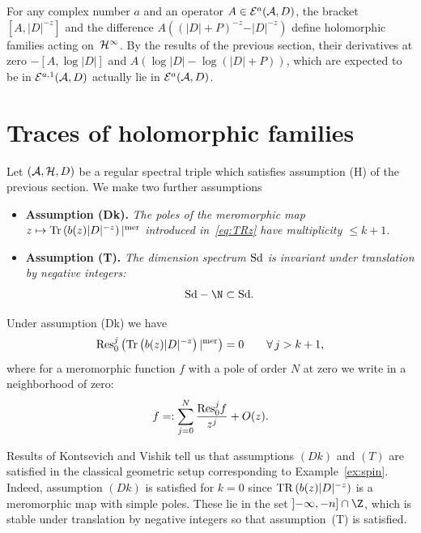 {\sloppy
\begin{example}\label{ex:differencelog}  For any complex number $a$ and an  operator $A\in {\cal E}^a({\cal A}, D)$,  the bracket $[A, \vert D\vert^{-z}]$ and
 the dif\/ference
 $A  \left((\vert D\vert +P)^{-z}-\vert D\vert^{-z }\right)$
  def\/ine holomorphic families acting on~${\cal H}^\infty$.
  By the results of the previous section, their derivatives at zero
   $-[A,\log \vert D\vert]$ and
   $A  \left(\log \vert D\vert -\log \left(\vert D\vert +P\right)\right)$, which are
    expected to be in $ {\cal E}^{a,1}({\cal A}, D)$ actually lie in
    $ {\cal E}^{a}({\cal A}, D)$.
\end{example}

}

\section{Traces of holomorphic families}\label{section5}

Let $\left({\cal A}, {\cal H}, D\right)$ be a regular spectral triple which
satisf\/ies assumption (H)  of the previous section. We  make two  further
assumptions\begin{itemize}
\item\itemsep=0pt
{\bf Assumption (Dk).} {\it  The poles of the meromorphic map $z\mapsto  {\rm Tr}\left(b(z) \vert
    D\vert^{-z}\right)\vert^{\rm mer} $ introduced in~\eqref{eq:TRz}
have  multiplicity $\leq  k+1$.}
\item {\bf Assumption (T).} {\it  The dimension spectrum ${\rm Sd}$ is
    invariant under translation by negative integers:}
    \[
    {\rm Sd}-\N \subset {\rm Sd}.
\]
\end{itemize}

\begin{remark} Under assumption (Dk) we have
\[
{\rm Res}^j_0 \left(  {\rm Tr}\left(b(z) \vert
    D\vert^{-z}\right)\vert^{\rm mer}\right)= 0\qquad \forall\, j> k+1,
\]
 where for
    a meromorphic function $f$ with a pole of order $N$ at zero we write in a
    neighborhood of zero:
\[
f=:\sum_{j=0}^N  \frac{{\rm Res}_0^j f}{z^j}+ O(z).
\]
\end{remark}

\begin{example} Results of Kontsevich and Vishik \cite{KV} tell us that assumptions $(Dk)$ and
  $(T)$ are satisf\/ied in the classical geometric setup   corresponding to
    Example~\ref{ex:spin}. Indeed, assumption  $(Dk)$  is satisf\/ied for $k=0$ since ${\rm
    TR}\left(b(z)  \vert D\vert^{-z}\right)$ is a meromorphic map
  with simple poles. These lie  in the set $]{-}\infty , -n]\cap
  \Z$, which is stable under translation by negative integers so that
  assumption~(T) is satisf\/ied.
\end{example}

